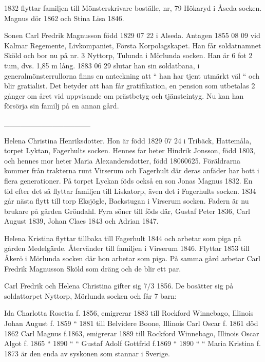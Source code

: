 1832 flyttar familjen till Mönsterskrivare boställe, nr, 79 Hökaryd i Åseda socken.
Magnus dör 1862 och Stina Lisa 1846.


Sonen Carl Fredrik Magnusson född 1829 07 22 i Alseda. Antagen 1855 08 09 vid Kalmar Regemente, Livkompaniet, Första Korpolagskapet. Han får soldatnamnet Sköld och bor nu på nr. 3 Nyttorp, Tulunda i Mörlunda socken. Han är 6 fot 2 tum, dvs. 1,85 m lång.
1883 06 29 slutar han sin soldatbana, i generalmönsterrullorna finns en anteckning att “ han har tjent utmärkt väl “ och blir gratialist. Det betyder att han får gratifikation, en pension som utbetalas 2 gånger om året vid uppvisande om prästbetyg och tjänsteintyg. Nu kan han försörja sin familj på en annan gård.




 


________________


Helena Christina Henriksdotter. Hon är född 1829 07 24 i Tribäck, Hattemåla, torpet  Lyktan, Fagerhults socken. Hennes far heter Hindrik Jonsson, född 1803, och hennes mor heter Maria Alexandersdotter, född 18060625. Föräldrarna kommer från trakterna runt Virserum och Fagerhult där deras anfäder har bott i flera generationer.
På torpet Lyckan föds också en son Jonas Magnus 1832. En tid efter det så flyttar familjen till Liskatorp, även det i Fagerhults socken.
1834 går nästa flytt till torp Eksjögle, Backstugan i Virserum socken. Fadern är nu brukare på gården Gröndahl. Fyra söner till föds där, Gustaf Peter 1836, Carl August 1839, Johan Claes 1843 och Adrian 1847.


Helena Kristina flyttar tillbaka till Fagerhult 1844 och arbetar som piga på gården Medelgärde. Återvänder till familjen i Virserum 1846. Flyttar 1853 till Åkerö i Mörlunda socken där hon arbetar som piga. På samma gård arbetar Carl Fredrik Magnusson Sköld som dräng och de blir ett par.





Carl Fredrik och Helena Christina gifter sig 7/3 1856. De bosätter sig på soldattorpet Nyttorp, Mörlunda socken och får 7 barn:


Ida Charlotta Rosetta f. 1856, emigrerar 1883 till Rockford Winnebago, Illinois
Johan August             f. 1859          “       1881 till Belvidere Boone, Illinois
Carl Oscar                  f. 1861 död 1862
Carl Magnus               f.1863,  emigrerar 1889 till Rockford Winnebago, Illinois
Oscar Algot                f. 1865          “        1890               “                           “                
Gustaf Adolf Gottfrid  f.1869           “        1890               “                           “
Maria Kristina f. 1873 är den enda av syskonen som stannar i Sverige.


